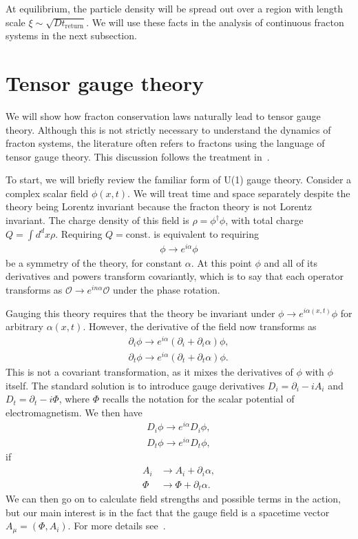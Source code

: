 \documentclass[a4paper,11pt]{article}
\newcommand{\ret}{\text{return}}
\newcommand{\nn}{\nonumber\\}
\begin{document}
At equilibrium, the particle density will be spread out over a region with length scale $\xi\sim\sqrt{Dt_\ret}$. We will use these facts in the analysis of continuous fracton systems in the next subsection.


\section{Tensor gauge theory} \label{sec:tensor}

We will show how fracton conservation laws naturally lead to tensor gauge theory. Although this is not strictly necessary to understand the dynamics of fracton systems, the literature often refers to fractons using the language of tensor gauge theory. This discussion follows the treatment in~\cite{PretkoFractonGauge}. 

To start, we will briefly review the familiar form of U(1) gauge theory. Consider a complex scalar field $\phi(x,t)$. We will treat time and space separately despite the theory being Lorentz invariant because the fracton theory is not Lorentz invariant. The charge density of this field is $\rho =\phi^\dag\phi$, with total charge $Q=\int d^dx \rho$. Requiring $Q=\text{const.}$ is equivalent to requiring
\begin{align}
\phi\to e^{i\alpha}\phi
\end{align}	
be a symmetry of the theory, for constant $\alpha$. At this point $\phi$ and all of its derivatives and powers transform covariantly, which is to say that each operator transforms as $\mathcal{O}\to e^{in\alpha}\mathcal{O}$ under the phase rotation.

Gauging this theory requires that the theory be invariant under $\phi\to e^{i\alpha(x,t)}\phi$ for arbitrary $\alpha(x,t)$. However, the derivative of the field now transforms as 
\begin{align}
\partial_i\phi\to e^{i\alpha}\left(\partial_i+\partial_i\alpha\right)\phi,\nn
\partial_t\phi\to e^{i\alpha}\left(\partial_t+\partial_t\alpha\right)\phi.
\label{eqn:nconv}
\end{align}
This is not a covariant transformation, as it mixes the derivatives of $\phi$ with $\phi$ itself. The standard solution is to introduce gauge derivatives $D_i=\partial_i-iA_i$ and $D_t=\partial_t-i\Phi$, where $\Phi$ recalls the notation for the scalar potential of electromagnetism. We then have 
\begin{align}
D_i\phi\to e^{i\alpha}D_i\phi,\nn
D_t\phi\to e^{i\alpha}D_t\phi,
\end{align}
if 
\begin{align}
A_i &\to A_i+\partial_i\alpha, \nn
\Phi&\to\Phi+\partial_t\alpha.
\end{align}
We can then go on to calculate field strengths and possible terms in the action, but our main interest is in the fact that the gauge field is a spacetime vector $A_\mu=(\Phi,A_i)$. For more details see~\cite{PretkoFractonGauge}.
\end{document}
